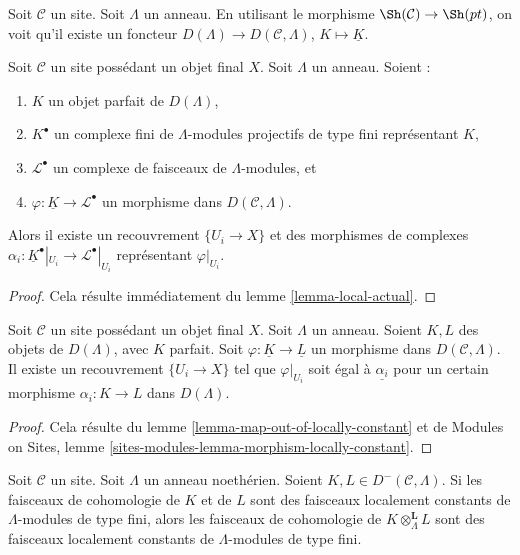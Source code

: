 \noindent
Soit $\mathcal{C}$ un site. Soit $\Lambda$ un anneau. En utilisant le
morphisme $\Sh(\mathcal{C}) \to \Sh(pt)$, on voit qu'il existe un foncteur
$D(\Lambda) \to D(\mathcal{C}, \Lambda)$, $K \mapsto \underline{K}$.

\begin{lemma}
\label{lemma-map-out-of-locally-constant}
Soit $\mathcal{C}$ un site possédant un objet final $X$. Soit $\Lambda$ un
anneau. Soient :
\begin{enumerate}
\item $K$ un objet parfait de $D(\Lambda)$,
\item $K^\bullet$ un complexe fini de $\Lambda$-modules projectifs de type
fini représentant $K$,
\item $\mathcal{L}^\bullet$ un complexe de faisceaux de $\Lambda$-modules, et
\item $\varphi : \underline{K} \to \mathcal{L}^\bullet$ un morphisme dans
$D(\mathcal{C}, \Lambda)$.
\end{enumerate}
Alors il existe un recouvrement $\{U_i \to X\}$ et des morphismes de complexes
$\alpha_i : \underline{K}^\bullet|_{U_i} \to \mathcal{L}^\bullet|_{U_i}$
représentant $\varphi|_{U_i}$.
\end{lemma}

\begin{proof}
Cela résulte immédiatement du lemme \ref{lemma-local-actual}.
\end{proof}

\begin{lemma}
\label{lemma-locally-constant-map}
Soit $\mathcal{C}$ un site possédant un objet final $X$. Soit $\Lambda$ un
anneau. Soient $K, L$ des objets de $D(\Lambda)$, avec $K$ parfait. Soit
$\varphi : \underline{K} \to \underline{L}$ un morphisme dans
$D(\mathcal{C}, \Lambda)$. Il existe un recouvrement $\{U_i \to X\}$ tel que
$\varphi|_{U_i}$ soit égal à $\underline{\alpha_i}$ pour un certain morphisme
$\alpha_i : K \to L$ dans $D(\Lambda)$.
\end{lemma}

\begin{proof}
Cela résulte du lemme \ref{lemma-map-out-of-locally-constant} et de Modules on
Sites, lemme \ref{sites-modules-lemma-morphism-locally-constant}.
\end{proof}

\begin{lemma}
\label{lemma-locally-constant-tensor-product}
Soit $\mathcal{C}$ un site. Soit $\Lambda$ un anneau noethérien. Soient
$K, L \in D^-(\mathcal{C}, \Lambda)$. Si les faisceaux de cohomologie de $K$
et de $L$ sont des faisceaux localement constants de $\Lambda$-modules de
type fini, alors les faisceaux de cohomologie de
$K \otimes_\Lambda^\mathbf{L} L$ sont des faisceaux localement constants de
$\Lambda$-modules de type fini.
\end{lemma}

